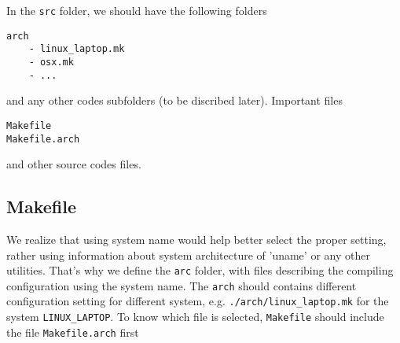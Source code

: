 In the \verb!src! folder, we should have the following folders
\begin{verbatim}
arch
	- linux_laptop.mk
	- osx.mk
	- ...	
\end{verbatim}
and any other codes subfolders (to be discribed later). Important files
\begin{verbatim}
Makefile
Makefile.arch
\end{verbatim}
and other source codes files.

\subsection{Makefile}
\label{sec:Makefile_EP_EM}


We realize that using system name would help better select the proper setting,
rather using information about system architecture of 'uname' or any other
utilities. That's why we define the \verb!arc! folder, with files describing the
compiling configuration using the system name. The \verb!arch! should contains
different configuration setting for different system, e.g.
\verb!./arch/linux_laptop.mk! for the system \verb!LINUX_LAPTOP!. To know which
file is selected, \verb!Makefile! should include the file \verb!Makefile.arch!
first

